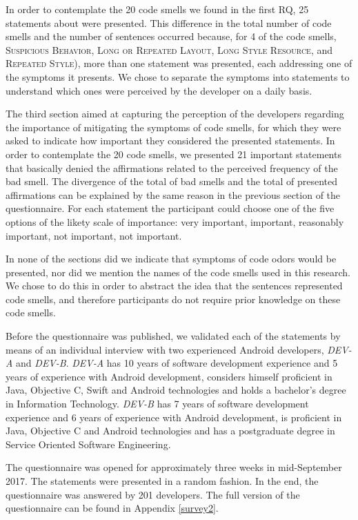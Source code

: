 In order to contemplate the 20 code smells we found in the first RQ, 25 statements about were presented. This difference in the total number of code smells and the number of sentences occurred because, for 4 of the code smells, \textsc{Suspicious Behavior}, 
\textsc{Long or Repeated Layout}, \textsc{Long Style Resource}, and \textsc{Repeated Style}), more than one statement was presented, each addressing one of the symptoms it presents. We chose to separate the symptoms into statements to understand which ones were perceived by the developer on a daily basis. 


The third section aimed at capturing the perception of the developers regarding the importance of mitigating the symptoms of code smells, for which they were asked to indicate how important they considered the presented statements. In order to contemplate the 20 code smells, we presented 21 important statements that basically denied the affirmations related to the perceived frequency of the bad smell. The divergence of the total of bad smells and the total of presented affirmations can be explained by the same reason in the previous section of the questionnaire. For each statement the participant could choose one of the five options of the likety scale of importance: very important, important, reasonably important, not important, not important.

In none of the sections did we indicate that symptoms of code odors would be presented, nor did we mention the names of the code smells used in this research. We chose to do this in order to abstract the idea that the sentences represented code smells, and therefore participants do not require prior knowledge on these code smells.

Before the questionnaire was published, we validated each of the statements by means of an individual interview with two experienced Android developers, \emph{DEV-A} and \emph{DEV-B}. 
\emph{DEV-A} has 10 years of software development experience and 5 years of experience with Android development, considers himself proficient in Java, Objective C, Swift and Android technologies and holds a bachelor's degree in Information Technology. \emph {DEV-B} has 7 years of software development experience and 6 years of experience with Android development, is proficient in Java, Objective C and Android technologies and has a postgraduate degree in Service Oriented Software Engineering. 

The questionnaire was opened for approximately three weeks in mid-September 2017. The statements were presented in a random fashion. In the end, the questionnaire was answered by 201 developers. The full version of the questionnaire can be found in Appendix \ref{survey2}.


